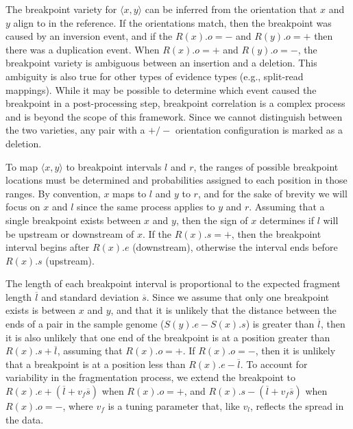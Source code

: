 \documentclass[10pt]{bmc_article}
\newenvironment{bmcformat}{\begin{raggedright}\baselineskip20pt\sloppy\setboolean{publ}{false}}{\end{raggedright}\baselineskip20pt\sloppy}
\begin{document}
\begin{bmcformat}
The breakpoint variety for $\langle x,y \rangle$ can be inferred from the
orientation that $x$ and $y$ align to in the reference.  If the orientations
match, then the breakpoint was caused by an inversion event, and if the
$R(x).o=-$ and $R(y).o=+$ then there was a duplication event.  When $R(x).o=+$
and $R(y).o=-$, the breakpoint variety is ambiguous between an insertion and a
deletion.  This ambiguity is also true for other types of evidence types (e.g.,
split-read mappings).  While it may be possible to determine which event caused
the breakpoint in a post-processing step, breakpoint correlation is a complex
process and is beyond the scope of this framework.  Since we cannot distinguish
between the two varieties, any pair with a $+/-$ orientation configuration is
marked as a deletion.

To map $\langle x,y \rangle$ to breakpoint intervals $l$ and $r$, the ranges of
possible breakpoint locations must be determined and probabilities assigned to
each position in those ranges.  By convention, $x$ maps to $l$ and $y$ to
$r$, and for the sake of brevity we will focus on $x$ and $l$ since the same
process applies to $y$ and $r$.  Assuming that a single breakpoint exists
between $x$ and $y$, then the sign of $x$ determines if $l$ will be upstream
or downstream of $x$.  If the $R(x).s=+$, then the breakpoint interval begins
after $R(x).e$ (downstream), otherwise the interval ends before $R(x).s$
(upstream). 

The length of each breakpoint interval is proportional to the expected fragment
length $\overline{l}$ and standard deviation $\overline{s}$.  Since we assume
that only one breakpoint exists is between $x$ and $y$, and that it is unlikely
that the distance between the ends of a pair in the sample genome ($S(y).e -
S(x).s$) is greater than $\overline{l}$, then it is also unlikely that one end
of the breakpoint is at a position greater than $R(x).s + \overline{l}$,
assuming that $R(x).o=+$. If $R(x).o=-$, then it is unlikely that a breakpoint
is at a position less than $R(x).e - \overline{l}$.  To account for variability
in the fragmentation process, we extend the breakpoint to
$R(x).e + (\overline{l} + v_f\overline{s})$ when $R(x).o=+$, and
$R(x).s - (\overline{l} + v_f\overline{s})$ when $R(x).o=-$,
where $v_f$ is a tuning parameter that, like $v_l$, reflects the spread in the
data.


\end{bmcformat}
\end{document}
